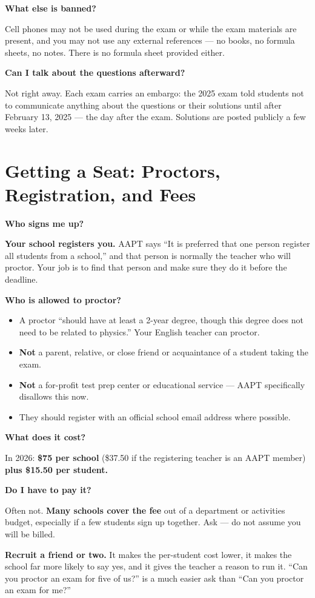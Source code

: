 \documentclass[11pt]{article}
\newcommand{\Q}[1]{\par\medskip\noindent\textbf{\color{qblue}#1}\par\nobreak\vspace{1pt}\nobreak}
\begin{document}
\Q{What else is banned?}
Cell phones may not be used during the exam or while the exam materials are present, and
you may not use any external references --- no books, no formula sheets, no notes. There is
no formula sheet provided either.

\Q{Can I talk about the questions afterward?}
Not right away. Each exam carries an embargo: the 2025 exam told students not to
communicate anything about the questions or their solutions until after February 13, 2025 ---
the day after the exam. Solutions are posted publicly a few weeks later.

\section{Getting a Seat: Proctors, Registration, and Fees}

\Q{Who signs me up?}
\textbf{Your school registers you.} AAPT says ``It is preferred that one person
register all students from a school,'' and that person is normally the teacher who will
proctor. Your job is to find that person and make sure they do it before the deadline.

\Q{Who is allowed to proctor?}
\begin{itemize}\setlength{\itemsep}{1pt}
\item A proctor ``should have at least a 2-year degree, though this degree does not need to
be related to physics.'' Your English teacher can proctor.
\item \textbf{Not} a parent, relative, or close friend or acquaintance of a student taking
the exam.
\item \textbf{Not} a for-profit test prep center or educational service --- AAPT
specifically disallows this now.
\item They should register with an official school email address where possible.
\end{itemize}

\Q{What does it cost?}
In 2026: \textbf{\$75 per school} (\$37.50 if the registering teacher is an AAPT member)
\textbf{plus \$15.50 per student.}

\Q{Do I have to pay it?}
Often not. \textbf{Many schools cover the fee} out of a department or activities budget,
especially if a few students sign up together. Ask --- do not assume you will be billed.

\begin{tipbox}
\textbf{Recruit a friend or two.} It makes the per-student cost lower, it makes the school
far more likely to say yes, and it gives the teacher a reason to run it. ``Can you proctor
an exam for five of us?'' is a much easier ask than ``Can you proctor an exam for me?''
\end{tipbox}
\end{document}
